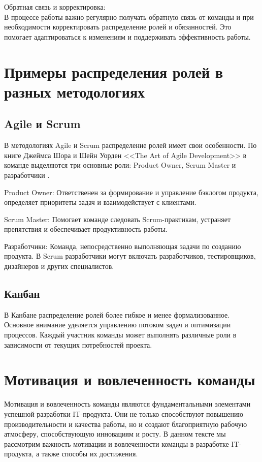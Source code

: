     Обратная связь и корректировка: \\
    В процессе работы важно регулярно получать обратную связь от команды и при необходимости корректировать распределение ролей и обязанностей. Это помогает адаптироваться к изменениям и поддерживать эффективность работы.

    \section{Примеры распределения ролей в разных методологиях}
    \subsection*{Agile и Scrum}
    В методологиях Agile и Scrum распределение ролей имеет свои особенности. По книге Джеймса Шора и Шейн Уорден <<The Art of Agile Development>> в команде выделяются три основные роли: Product Owner, Scrum Master и разработчики \cite{shore2021art}.
    
    Product Owner: Ответственен за формирование и управление бэклогом продукта, определяет приоритеты задач и взаимодействует с клиентами.

    Scrum Master: Помогает команде следовать Scrum-практикам, устраняет препятствия и обеспечивает продуктивность работы.

    Разработчики: Команда, непосредственно выполняющая задачи по созданию продукта. В Scrum разработчики могут включать разработчиков, тестировщиков, дизайнеров и других специалистов.

    \subsection*{Канбан}
    В Канбане распределение ролей более гибкое и менее формализованное. Основное внимание уделяется управлению потоком задач и оптимизации процессов. Каждый участник команды может выполнять различные роли в зависимости от текущих потребностей проекта.

    \section{Мотивация и вовлеченность команды}
    Мотивация и вовлеченность команды являются фундаментальными элементами успешной разработки IT-продукта. Они не только способствуют повышению производительности и качества работы, но и создают благоприятную рабочую атмосферу, способствующую инновациям и росту. В данном тексте мы рассмотрим важность мотивации и вовлеченности команды в разработке IT-продукта, а также способы их достижения.

